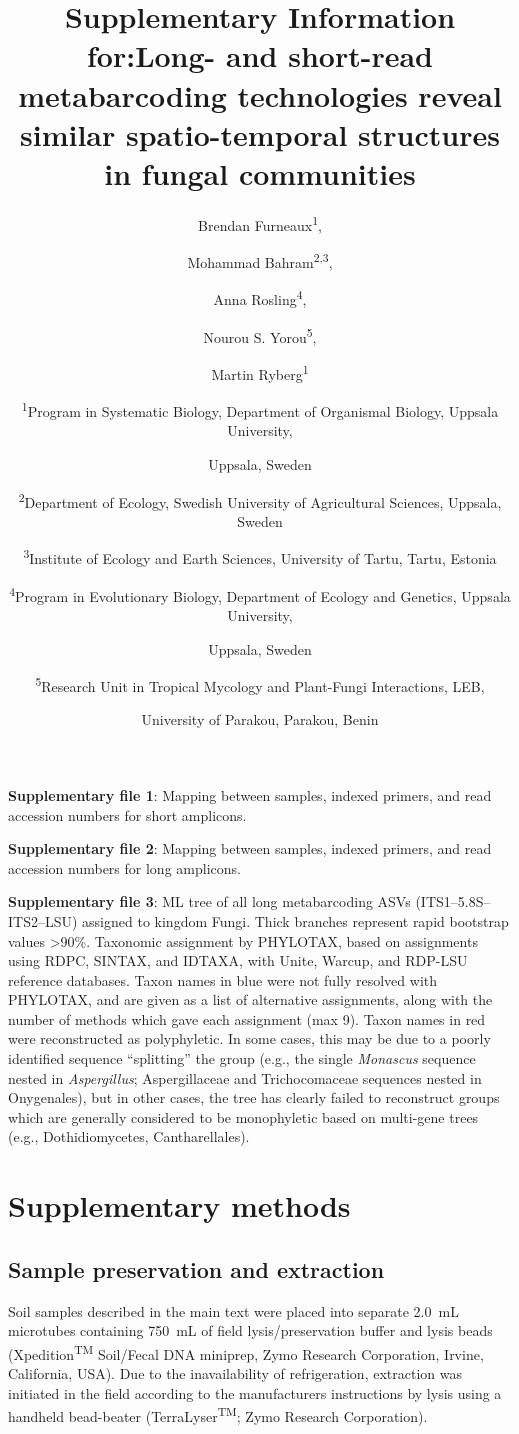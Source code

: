 \documentclass[
]{article}
\title{Supplementary Information for:Long- and short-read metabarcoding technologies reveal similar spatio-temporal structures in fungal communities}
\author{Brendan Furneaux\textsuperscript{1}, \and Mohammad Bahram\textsuperscript{2,3}, \and Anna Rosling\textsuperscript{4}, \and Nourou S. Yorou\textsuperscript{5}, \and Martin Ryberg\textsuperscript{1} \and \textsuperscript{1}Program in Systematic Biology, Department of Organismal Biology, Uppsala University, \and Uppsala, Sweden \and \textsuperscript{2}Department of Ecology, Swedish University of Agricultural Sciences, Uppsala, Sweden \and \textsuperscript{3}Institute of Ecology and Earth Sciences, University of Tartu, Tartu, Estonia \and \textsuperscript{4}Program in Evolutionary Biology, Department of Ecology and Genetics, Uppsala University, \and Uppsala, Sweden \and \textsuperscript{5}Research Unit in Tropical Mycology and Plant-Fungi Interactions, LEB, \and University of Parakou, Parakou, Benin}
\date{}
\begin{document}
\maketitle

\textbf{Supplementary file 1}: Mapping between samples, indexed primers, and read accession numbers for short amplicons.

\textbf{Supplementary file 2}: Mapping between samples, indexed primers, and read accession numbers for long amplicons.

\textbf{Supplementary file 3}: ML tree of all long metabarcoding ASVs (ITS1--5.8S--ITS2--LSU) assigned to kingdom Fungi.
Thick branches represent rapid bootstrap values \textgreater90\%.
Taxonomic assignment by PHYLOTAX, based on assignments using RDPC, SINTAX, and IDTAXA, with Unite, Warcup, and RDP-LSU reference databases.
Taxon names in blue were not fully resolved with PHYLOTAX, and are given as a list of alternative assignments, along with the number of methods which gave each assignment (max 9).
Taxon names in red were reconstructed as polyphyletic.
In some cases, this may be due to a poorly identified sequence ``splitting'' the group (e.g., the single \emph{Monascus} sequence nested in \emph{Aspergillus}; Aspergillaceae and Trichocomaceae sequences nested in Onygenales), but in other cases, the tree has clearly failed to reconstruct groups which are generally considered to be monophyletic based on multi-gene trees (e.g., Dothidiomycetes, Cantharellales).

\hypertarget{supplementary-methods}{%
\section{Supplementary methods}\label{supplementary-methods}}

\hypertarget{Sampling-supplement}{%
\subsection{Sample preservation and extraction}\label{Sampling-supplement}}

Soil samples described in the main text were placed into separate 2.0~mL microtubes containing 750~mL of field lysis/preservation buffer and lysis beads (Xpedition\textsuperscript{TM} Soil/Fecal DNA miniprep, Zymo Research Corporation, Irvine, California, USA).
Due to the inavailability of refrigeration, extraction was initiated in the field according to the manufacturers instructions by lysis using a handheld bead-beater (TerraLyser\textsuperscript{TM}; Zymo Research Corporation).
\end{document}
